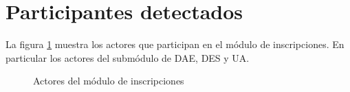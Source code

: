 \section{Participantes detectados}

La figura \ref{fig:actoresIN} muestra los actores que participan en el módulo de inscripciones. En particular los actores del submódulo de DAE, DES y UA. %

\begin{figure}[htbp]
	\begin{center}
		\caption{Actores del módulo de inscripciones}
		\label{fig:actoresIN}
	\end{center}
\end{figure}

